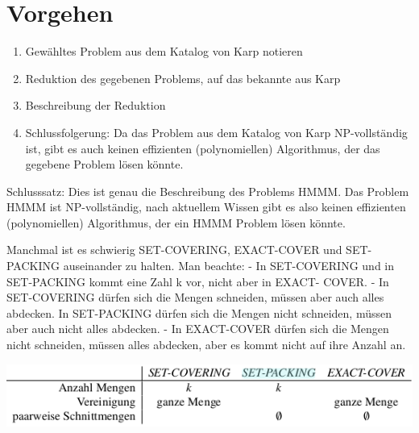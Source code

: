\section{Vorgehen}
\begin{enumerate}
\item Gewähltes Problem aus dem Katalog von Karp notieren
\item Reduktion des gegebenen Problems, auf das bekannte aus Karp
\item Beschreibung der Reduktion
\item Schlussfolgerung: Da das Problem aus dem Katalog von Karp NP-vollständig ist, gibt es auch keinen effizienten (polynomiellen) Algorithmus, der das gegebene Problem lösen könnte.
\end{enumerate}
Schlusssatz:
Dies ist genau die Beschreibung des Problems HMMM. Das Problem HMMM ist NP-vollständig, nach aktuellem Wissen gibt es also keinen effizienten (polynomiellen) Algorithmus, der ein HMMM Problem lösen könnte.

Manchmal ist es schwierig SET-COVERING, EXACT-COVER und SET-PACKING auseinander
zu halten. Man beachte:
- In SET-COVERING und in SET-PACKING kommt eine Zahl k vor, nicht aber in EXACT-
COVER.
- In SET-COVERING dürfen sich die Mengen schneiden, müssen aber auch alles abdecken.
In SET-PACKING dürfen sich die Mengen nicht schneiden, müssen aber auch nicht alles
abdecken.
- In EXACT-COVER dürfen sich die Mengen nicht schneiden, müssen alles abdecken, aber
es kommt nicht auf ihre Anzahl an.

\includegraphics[width=\columnwidth]{img/setvscoveringvsexact.png}